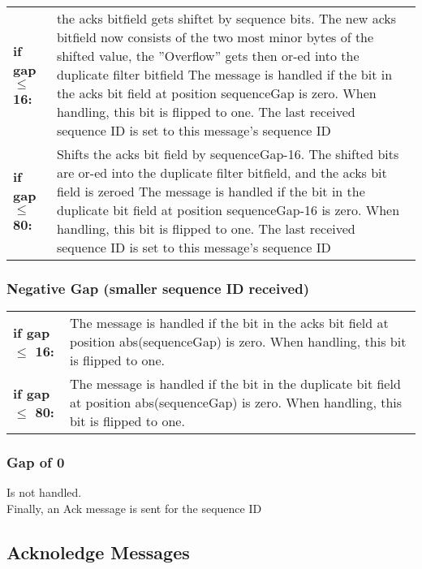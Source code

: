 \begin{tabular}{p{\tableft}p{\tabright}}
	\textbf{if gap $\le$ 16:} & the acks bitfield gets shiftet by sequence bits. The new acks bitfield now consists of the two most minor bytes of the shifted value, the ''Overflow'' gets then or-ed into the duplicate filter bitfield \newline The message is handled if the bit in the acks bit field at position sequenceGap is zero. When handling, this bit is flipped to one. \newline The last received sequence ID is set to this message's sequence ID \\
	\textbf{if gap $\le$ 80:} & Shifts the acks bit field by sequenceGap-16. The shifted bits are or-ed into the duplicate filter bitfield, and the acks bit field is zeroed \newline The message is handled if the bit in the duplicate bit field at position sequenceGap-16 is zero. When handling, this bit is flipped to one. \newline The last received sequence ID is set to this message's sequence ID \\
\end{tabular}

\subsubsection{Negative Gap (smaller sequence ID received)}

\begin{tabular}{p{\tableft}p{\tabright}}
	\textbf{if gap $\le$ 16:} & The message is handled if the bit in the acks bit field at position abs(sequenceGap) is zero. When handling, this bit is flipped to one.\\
	\textbf{if gap $\le$ 80:} & The message is handled if the bit in the duplicate bit field at position abs(sequenceGap) is zero. When handling, this bit is flipped to one. \\
\end{tabular}

\subsubsection{Gap of 0}

Is not handled. \\

Finally, an Ack message is sent for the sequence ID

\subsection{Acknoledge Messages}

